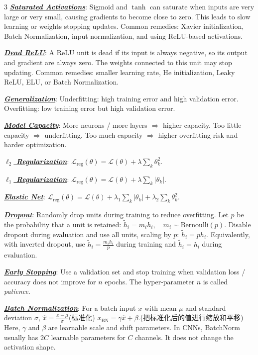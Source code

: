 \documentclass[12pt]{article}
\newcommand{\bulletPoint}[1]{\underline{\textit{\textbf{#1}}}}
\begin{document}
\begin{multicols*}{3}
\bulletPoint{Saturated Activations}:
Sigmoid and $\tanh$ can saturate when inputs are very large or very small, causing gradients to become close to zero.
This leads to slow learning or weights stopping updates.
Common remedies: Xavier initialization, Batch Normalization, input normalization, and using ReLU-based activations.

\bulletPoint{Dead ReLU}:
A ReLU unit is dead if its input is always negative, so its output and gradient are always zero.
The weights connected to this unit may stop updating.
Common remedies: smaller learning rate, He initialization, Leaky ReLU, ELU, or Batch Normalization.

\bulletPoint{Generalization}:
Underfitting: high training error and high validation error.
Overfitting: low training error but high validation error.

\bulletPoint{Model Capacity}:
More neurons / more layers $\Rightarrow$ higher capacity.
Too little capacity $\Rightarrow$ underfitting.
Too much capacity $\Rightarrow$ higher overfitting risk and harder optimization.

\bulletPoint{$\ell_2$ Regularization}:
\textcolor{purple!60!black}{$\textstyle
\mathcal L_{\mathrm{reg}}(\theta)
=
\mathcal L(\theta)+\lambda \sum_k \theta_k^2.
$}

\bulletPoint{$\ell_1$ Regularization}:
$\mathcal L_{\mathrm{reg}}(\theta)=\mathcal L(\theta)+\lambda \sum_k |\theta_k|.$

\bulletPoint{Elastic Net}:
$\mathcal L_{\mathrm{reg}}(\theta)
=
\mathcal L(\theta)+\lambda_1\sum_k |\theta_k|+\lambda_2\sum_k \theta_k^2.$

\bulletPoint{Dropout}:
Randomly drop units during training to reduce overfitting.
Let $p$ be the probability that a unit is retained:
$
\tilde{h}_i = m_i h_i, \quad m_i \sim \mathrm{Bernoulli}(p).
$
Disable dropout during evaluation and use all units, scaling by $p$:
$
\tilde{h}_i = p h_i.
$
Equivalently, with inverted dropout, use $\tilde{h}_i = \frac{m_i h_i}{p}$ during training and $\tilde{h}_i = h_i$ during evaluation.

\bulletPoint{Early Stopping}:
Use a validation set and stop training when validation loss / accuracy does not improve for $n$ epochs.
The hyper-parameter $n$ is called \emph{patience}.

\bulletPoint{Batch Normalization}:
For a batch input $x$ with mean $\mu$ and standard deviation $\sigma$,
$
\hat{x}=\frac{x-\mu}{\sigma}$(标准化) $ x_{\mathrm{BN}}=\gamma \hat{x}+\beta .
$(把标准化后的值进行缩放和平移)
Here, $\gamma$ and $\beta$ are learnable scale and shift parameters. In CNNs, BatchNorm usually has $2C$ learnable parameters for $C$ channels. It does not change the activation shape.


\end{multicols*}
\end{document}
